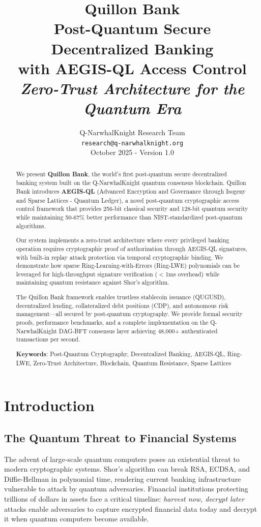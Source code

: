 \documentclass[11pt,a4paper]{article}
\title{
    \vspace{-2cm}
    \Huge\textbf{Quillon Bank} \\
    \vspace{0.5cm}
    \LARGE Post-Quantum Secure Decentralized Banking \\
    with AEGIS-QL Access Control \\
    \vspace{0.3cm}
    \large\textit{Zero-Trust Architecture for the Quantum Era}
}
\author{
    Q-NarwhalKnight Research Team \\
    \texttt{research@q-narwhalknight.org} \\
    \vspace{0.2cm}
    \small October 2025 - Version 1.0
}
\date{}
\begin{document}
\maketitle

\begin{abstract}
We present \textbf{Quillon Bank}, the world's first post-quantum secure decentralized banking system built on the Q-NarwhalKnight quantum consensus blockchain. Quillon Bank introduces \textbf{AEGIS-QL} (Advanced Encryption and Governance through Isogeny and Sparse Lattices - Quantum Ledger), a novel post-quantum cryptographic access control framework that provides 256-bit classical security and 128-bit quantum security while maintaining 50-67\% better performance than NIST-standardized post-quantum algorithms.

Our system implements a zero-trust architecture where every privileged banking operation requires cryptographic proof of authorization through AEGIS-QL signatures, with built-in replay attack protection via temporal cryptographic binding. We demonstrate how sparse Ring-Learning-with-Errors (Ring-LWE) polynomials can be leveraged for high-throughput signature verification ($<$1ms overhead) while maintaining quantum resistance against Shor's algorithm.

The Quillon Bank framework enables trustless stablecoin issuance (QUGUSD), decentralized lending, collateralized debt positions (CDP), and autonomous risk management—all secured by post-quantum cryptography. We provide formal security proofs, performance benchmarks, and a complete implementation on the Q-NarwhalKnight DAG-BFT consensus layer achieving 48,000+ authenticated transactions per second.

\textbf{Keywords}: Post-Quantum Cryptography, Decentralized Banking, AEGIS-QL, Ring-LWE, Zero-Trust Architecture, Blockchain, Quantum Resistance, Sparse Lattices
\end{abstract}

\tableofcontents
\newpage

\section{Introduction}

\subsection{The Quantum Threat to Financial Systems}

The advent of large-scale quantum computers poses an existential threat to modern cryptographic systems. Shor's algorithm \cite{shor1997} can break RSA, ECDSA, and Diffie-Hellman in polynomial time, rendering current banking infrastructure vulnerable to attack by quantum adversaries. Financial institutions protecting trillions of dollars in assets face a critical timeline: \textit{harvest now, decrypt later} attacks enable adversaries to capture encrypted financial data today and decrypt it when quantum computers become available.
\end{document}
